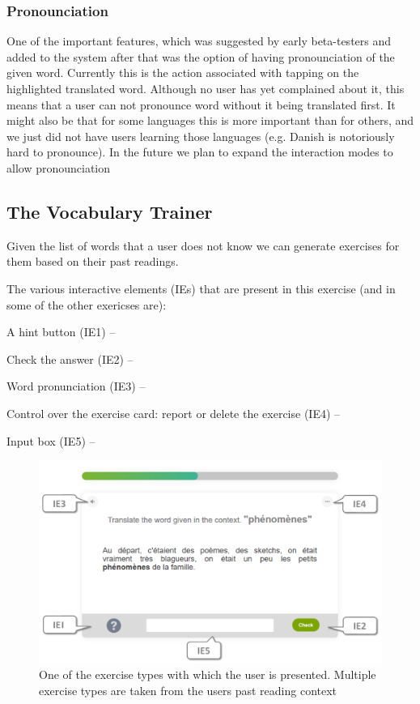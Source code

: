 \subsubsection{Pronounciation}
One of the important features, which was suggested by early beta-testers and added to the system after that was the option of having pronounciation of the given word. Currently this is the action associated with tapping on the highlighted translated word. Although no user has yet complained about it, this means that a user can not pronounce word without it being translated first. It might also be that for some languages this is more important than for others, and we just did not have users learning those languages (e.g. Danish is notoriously hard to pronounce). In the future we plan to expand the interaction modes to allow pronounciation 

\subsection{The Vocabulary Trainer}

Given the list of words that a user does not know we can generate exercises for them based on their past readings.

The various interactive elements (IEs) that are present in this exercise (and in some of the other exericses are): 

\begin{description}
	\item A hint button (IE1) --
	\item Check the answer (IE2) -- 
	\item Word pronunciation (IE3) -- 
	\item Control over the exercise card: report or delete the exercise (IE4) -- 
	\item Input box (IE5) -- 
\end{description}

\begin{figure}[h!]
\centering
  \includegraphics[width=\columnwidth]{figures/exercise_translate}
  \caption{One of the exercise types with which the user is presented. Multiple exercise types are taken from the users past reading context}
\end{figure}

